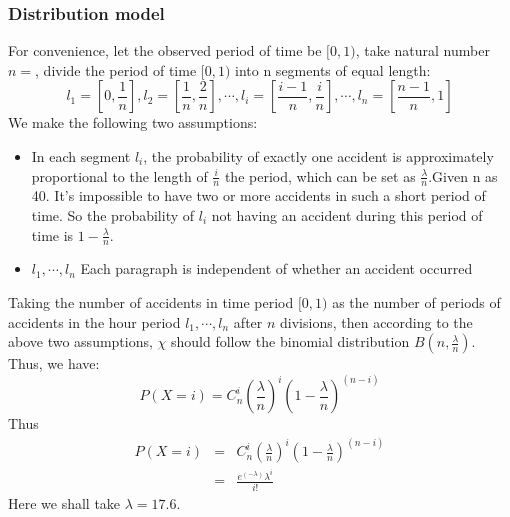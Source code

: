 \subsubsection{Distribution model}
For convenience, let the observed period of time be $[0,1)$, take natural number $n=$, divide the period of time $[0,1)$ into n segments of equal length:
\begin{equation}
	l_1=[0,\frac{1}{n}],l_2=[\frac{1}{n},\frac{2}{n}],\cdots,l_i=[\frac{i-1}{n},\frac{i}{n}],\cdots,l_n=[\frac{n-1}{n},1]
\end{equation}
We make the following two assumptions:
\begin{itemize}
	\item In each segment $l_i$, the probability of exactly one accident is approximately proportional to the length of $\frac{i}{n}$ the period, which can be set as $\frac{\lambda}{n}$.Given n as 40. It's impossible to have two or more accidents in such a short period of time. So the probability of $l_i$ not having an accident during this period of time is $1-\frac{\lambda}{n}$.
	\item $l_1,\cdots,l_n$ Each paragraph is independent of whether an accident occurred
\end{itemize}
Taking the number of accidents in time period $[0,1)$ as the number of periods of accidents in the hour period $l_1,\cdots,l_n$ after $n$ divisions, then according to the above two assumptions, $\chi$ should follow the binomial distribution $B(n,\frac{\lambda}{n})$. Thus, we have:
\begin{equation}
	P(X=i)=C_n^i(\frac{\lambda}{n})^i(1-\frac{\lambda}{n})^(n-i)
\end{equation}
Thus
\begin{eqnarray}
P(X=i)&=&C_n^i(\frac{\lambda}{n})^i(1-\frac{\lambda}{n})^(n-i)\nonumber \\
&=&\frac{e^(-\lambda)\lambda^i}{i!}
\end{eqnarray}
Here we shall take $\lambda=17.6$.